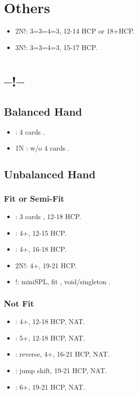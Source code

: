 \documentclass[12pt,twoside,a5paper]{report}%
\begin{document}
	\section*{Others}
	\begin{itemize}
	\renewcommand{\labelitemi}{}
	\item 2N!: 3=3=4=3, 12-14 HCP or 18+HCP.
	\item 3N!: 3=3=4=3, 15-17 HCP.
	\end{itemize}

	\section*{--!--}
	\subsection*{Balanced Hand}
	\begin{itemize}
	\renewcommand{\labelitemi}{}
		\item {} : 4 cards \he{}.
		\item 1N : w/o 4 cards \he{}.
	\end{itemize}

	\subsection*{Unbalanced Hand}

	\subsubsection*{Fit or Semi-Fit}
	\begin{itemize}
	\renewcommand{\labelitemi}{}	
		\item {} : 3 cards \he{}, 12-18 HCP.
		\item {} : 4+\he{}, 12-15 HCP.
		\item {} : 4+\he{}, 16-18 HCP.
		\item 2N!: 4+\he{}, 19-21 HCP.
		\item {}!: miniSPL, fit \he{}, void/singleton \di{}.
	\end{itemize}

	\subsubsection*{Not Fit}
	\begin{itemize}
	\renewcommand{\labelitemi}{}
		\item {} : 4+\sp{}, 12-18 HCP, NAT.
		\item {} : 5+\cl{}, 12-18 HCP, NAT.
		\item {} : reverse, 4+\di{}, 16-21 HCP, NAT.
		\item {} : jump shift, 19-21 HCP, NAT. 
		\item {} : 6+\cl{}, 19-21 HCP, NAT.
	\end{itemize}
\end{document}
